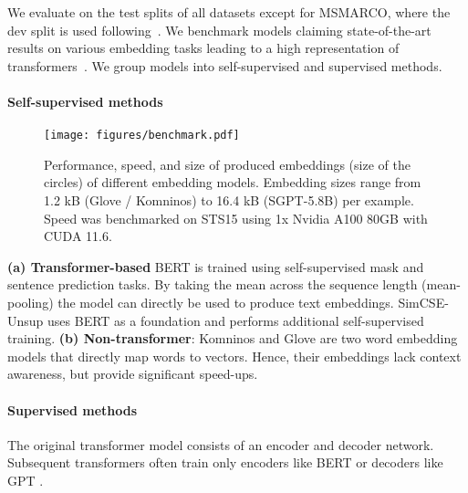 \documentclass[11pt]{article}
\begin{document}
We evaluate on the test splits of all datasets except for MSMARCO, where the dev split is used following~\citet{beir}. We benchmark models claiming state-of-the-art results on various embedding tasks leading to a high representation of transformers~\cite{vaswani2017attention}. We group models into self-supervised and supervised methods.

\paragraph{Self-supervised methods}

\begin{figure*}[t]
    \centering
    \begin{center}
        \texttt{[image: figures/benchmark.pdf]}
        \caption{Performance, speed, and size of produced embeddings (size of the circles) of different embedding models. Embedding sizes range from 1.2 kB (Glove / Komninos) to 16.4 kB (SGPT-5.8B) per example. Speed was benchmarked on STS15 using 1x Nvidia A100 80GB with CUDA 11.6.}
        \label{fig:latency}
    \end{center}
\end{figure*}


\textbf{(a) Transformer-based} BERT \cite{devlin2018bert} is trained using self-supervised mask and sentence prediction tasks. By taking the mean across the sequence length (mean-pooling) the model can directly be used to produce text embeddings. SimCSE-Unsup \cite{gao2021simcse} uses BERT as a foundation and performs additional self-supervised training. \textbf{(b) Non-transformer}: Komninos \cite{komninos2016dependency} and Glove \cite{pennington2014glove} are two word embedding models that directly map words to vectors. Hence, their embeddings lack context awareness, but provide significant speed-ups.

\paragraph{Supervised methods} The original transformer model \cite{vaswani2017attention} consists of an encoder and decoder network. Subsequent transformers often train only encoders like BERT \cite{devlin2018bert} or decoders like GPT \cite{radford2019language}.
\end{document}
